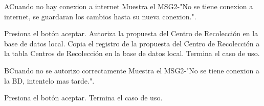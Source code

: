 \begin{UCtrayectoriaA}{A}{Cuando no hay conexion a internet}
	\UCpaso Muestra el MSG2-"No se tiene conexion a internet, se guardaran los cambios hasta su nueva conexion.".
	\item\UCactor Presiona el botón aceptar.
	\UCpaso Autoriza la propuesta del Centro de Recolección en la base de datos local.	
	\UCpaso Copia el registro de la propuesta del Centro de Recolección a la tabla Centros de Recolección en la base de datos local.
	\UCpaso[] Termina el caso de uso.
\end{UCtrayectoriaA}

\begin{UCtrayectoriaA}{B}{Cuando no se autorizo correctamente}
	\UCpaso Muestra el MSG2-"No se tiene conexion a la BD, intentelo mas tarde.".
	\item\UCactor Presiona el botón aceptar.
	\UCpaso[] Termina el caso de uso.
\end{UCtrayectoriaA}